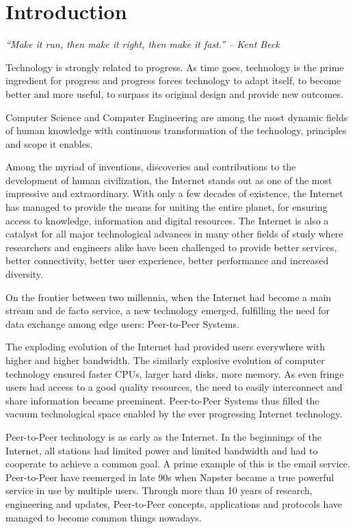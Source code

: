 
\chapter{Introduction}
\label{chapter:intro}

\textit{``Make it run, then make it right, then make it fast.'' -- Kent Beck}

Technology is strongly related to progress. As time goes, technology is the
prime ingredient for progress and progress forces technology to adapt itself,
to become better and more useful, to surpass its original design and provide
new outcomes.

Computer Science and Computer Engineering are among the most dynamic fields of
human knowledge with continuous transformation of the technology, principles
and scope it enables.

Among the myriad of inventions, discoveries and contributions to the
development of human civilization, the Internet stands out as one of the
most impressive and extraordinary. With only a few decades of existence, the
Internet has managed to provide the means for uniting the entire planet, for
ensuring access to knowledge, information and digital resources. The Internet
is also a catalyst for all major technological advances in many other fields
of study where researchers and engineers alike have been challenged to provide
better services, better connectivity, better user experience, better
performance and increased diversity.

On the frontier between two millennia, when the Internet had become a main
stream and de facto service, a new technology emerged, fulfilling the need for
data exchange among edge users: Peer-to-Peer Systems.

The exploding evolution of the Internet had provided users everywhere with
higher and higher bandwidth. The similarly explosive evolution of computer
technology ensured faster CPUs, larger hard disks, more memory. As even fringe
users had access to a good quality resources, the need to easily interconnect
and share information became preeminent. Peer-to-Peer Systems thus filled the
vacuum technological space enabled by the ever progressing Internet
technology.

Peer-to-Peer technology is as early as the Internet. In the beginnings of the
Internet, all stations had limited power and limited bandwidth and had to
cooperate to achieve a common goal. A prime example of this is the email
service. Peer-to-Peer have reemerged in late 90s when Napster became a true
powerful service in use by multiple users. Through more than 10 years of
research, engineering and updates, Peer-to-Peer concepts, applications and
protocols have managed to become common things nowadays.


